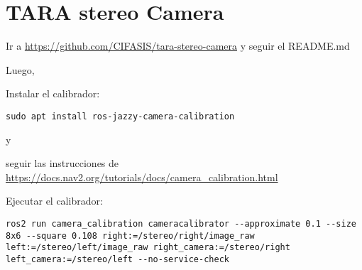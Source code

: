 \documentclass[apunte]{lcc}
\begin{document}
\maketitle

\section{TARA stereo Camera}

Ir a \url{https://github.com/CIFASIS/tara-stereo-camera} y seguir el README.md

Luego,

Instalar el calibrador:

\begin{lstlisting}[style=bash]
sudo apt install ros-jazzy-camera-calibration
\end{lstlisting}

y 

seguir las instrucciones de \url{https://docs.nav2.org/tutorials/docs/camera_calibration.html}


Ejecutar el calibrador:

\begin{lstlisting}[style=bash]
ros2 run camera_calibration cameracalibrator --approximate 0.1 --size 8x6 --square 0.108 right:=/stereo/right/image_raw left:=/stereo/left/image_raw right_camera:=/stereo/right left_camera:=/stereo/left --no-service-check\end{lstlisting}
\end{document}
